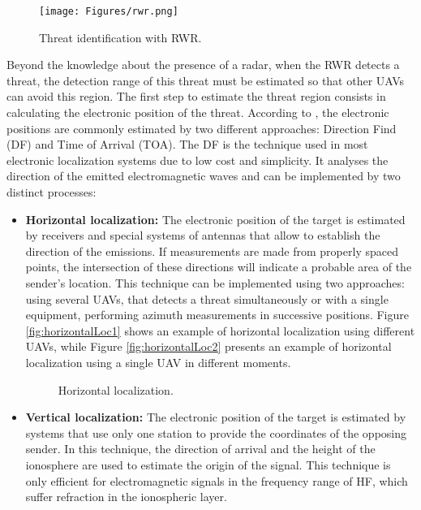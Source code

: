 \begin{figure}[h!]
\centering
\texttt{[image: Figures/rwr.png]}
\caption{Threat identification with RWR.}
\label{fig:rwr}
\end{figure}

Beyond the knowledge about the presence of a radar, when the RWR detects a threat, the detection range of this threat must be estimated so that other UAVs can avoid this region. The first step to estimate the threat region consists in calculating the electronic position of the threat. According to \cite{exercito_2009}, the electronic positions are commonly estimated by two different approaches: Direction Find (DF) and Time of Arrival (TOA). The DF is the technique used in most electronic localization systems due to low cost and simplicity. It analyses the direction of the emitted electromagnetic waves and can be implemented by two distinct processes:

\begin{itemize}
    \item \textbf{Horizontal localization:} The electronic position of the target is estimated by receivers and special systems of antennas that allow to establish the direction of the emissions. If measurements are made from properly spaced points, the intersection of these directions will indicate a probable area of the sender's location. This technique can be implemented using two approaches: using several UAVs, that detects a threat simultaneously or with a single equipment, performing azimuth measurements in successive positions. Figure \ref{fig:horizontalLoc1} shows an example of horizontal localization using different UAVs, while Figure \ref{fig:horizontalLoc2} presents an example of horizontal localization using a single UAV in different moments. 
        
    \begin{figure}[h!]
      \centering
      \caption{Horizontal localization.}      
    \end{figure}
    
    \item \textbf{Vertical localization:} The electronic position of the target is estimated by systems that use only one station to provide the coordinates of the opposing sender. In this technique, the direction of arrival and the height of the ionosphere are used to estimate the origin of the signal. This technique is only efficient for electromagnetic signals in the frequency range of HF, which suffer refraction in the ionospheric layer.
\end{itemize}

